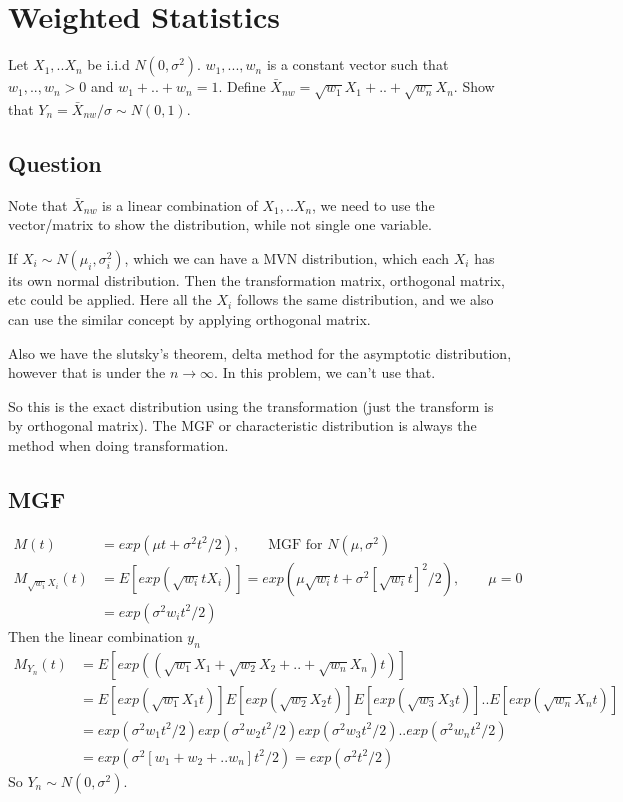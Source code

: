 \documentclass[11pt]{article} %
\begin{document}
\section{Weighted Statistics}
Let $X_1,.. X_n$ be i.i.d $N(0, \sigma^2)$. $w_1, ..., w_n$ is a constant vector such that $w_1,.., w_n > 0$ and $w_1 + .. + w_n = 1$. Define $\bar{X}_{nw} = \sqrt{w_1} X_1 + .. + \sqrt{w_n} X_n$. Show that $Y_n = \bar{X}_{nw}/\sigma \sim N(0,1)$. 

\subsection{Question}

Note that $\bar{X}_{nw}$ is a linear combination of $X_1,.. X_n$, we need to use the vector/matrix to show the distribution, while not single one variable. 

If $X_i \sim N(\mu_i, \sigma_i^2)$, which we can have a MVN distribution, which each $X_i$ has its own normal distribution. Then the transformation matrix, orthogonal matrix, etc could be applied. Here all the $X_i$ follows the same distribution, and we also can use the similar concept by applying orthogonal matrix. 

Also we have the slutsky's theorem, delta method for the asymptotic distribution, however that is under the $n \rightarrow \infty$. In this problem, we can't use that.

So this is the exact distribution using the transformation (just the transform is by orthogonal matrix). The MGF or characteristic distribution is always the method when doing transformation.

\subsection{MGF}

\begin{align*}
	M(t) &= exp(\mu t + \sigma^2 t^2/2), \qquad \text{MGF for } N(\mu, \sigma^2)\\
	M_{\sqrt{w_i}X_i}(t) &= E[exp(\sqrt{w_i} t X_i)] = exp(\mu \sqrt{w_i} t + \sigma^2 [\sqrt{w_i} t]^2/2), \qquad \mu=0 \\
	&= exp(\sigma^2 w_i t^2/2)
\end{align*}
Then the linear combination $y_n$
\begin{align*}
	M_{Y_n}(t) &= E[exp \left( (\sqrt{w_1} X_1 + \sqrt{w_2} X_2 + .. + \sqrt{w_n} X_n) t \right)] \\
	&= E[exp(\sqrt{w_1} X_1 t)] E[exp(\sqrt{w_2} X_2 t)] E[exp(\sqrt{w_3} X_3 t)].. E[exp(\sqrt{w_n} X_n t)] \\
	&= exp(\sigma^2 w_1 t^2/2) exp(\sigma^2 w_2 t^2/2) exp(\sigma^2 w_3 t^2/2).. exp(\sigma^2 w_n t^2/2) \\
	&= exp(\sigma^2 [w_1+ w_2 + .. w_n] t^2/2) = exp(\sigma^2 t^2/2)
\end{align*}
So $Y_n \sim N(0, \sigma^2)$. 
\end{document}
